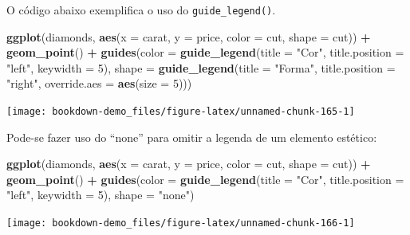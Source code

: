 \documentclass[]{book}
\newenvironment{Shaded}{\begin{snugshade}}{\end{snugshade}}
\newcommand{\KeywordTok}[1]{\textcolor[rgb]{0.13,0.29,0.53}{\textbf{#1}}}
\newcommand{\DataTypeTok}[1]{\textcolor[rgb]{0.13,0.29,0.53}{#1}}
\newcommand{\DecValTok}[1]{\textcolor[rgb]{0.00,0.00,0.81}{#1}}
\newcommand{\StringTok}[1]{\textcolor[rgb]{0.31,0.60,0.02}{#1}}
\newcommand{\OperatorTok}[1]{\textcolor[rgb]{0.81,0.36,0.00}{\textbf{#1}}}
\newcommand{\NormalTok}[1]{#1}
\begin{document}
O código abaixo exemplifica o uso do \texttt{guide\_legend()}.

\begin{Shaded}
\begin{Highlighting}[]
\KeywordTok{ggplot}\NormalTok{(diamonds, }\KeywordTok{aes}\NormalTok{(}\DataTypeTok{x =}\NormalTok{ carat, }\DataTypeTok{y =}\NormalTok{ price, }\DataTypeTok{color =}\NormalTok{ cut, }\DataTypeTok{shape =}\NormalTok{ cut)) }\OperatorTok{+}
\StringTok{  }\KeywordTok{geom_point}\NormalTok{() }\OperatorTok{+}
\StringTok{  }\KeywordTok{guides}\NormalTok{(}\DataTypeTok{color =} \KeywordTok{guide_legend}\NormalTok{(}\DataTypeTok{title =} \StringTok{"Cor"}\NormalTok{, }\DataTypeTok{title.position =} \StringTok{"left"}\NormalTok{, }\DataTypeTok{keywidth =} \DecValTok{5}\NormalTok{),}
         \DataTypeTok{shape =} \KeywordTok{guide_legend}\NormalTok{(}\DataTypeTok{title =} \StringTok{"Forma"}\NormalTok{, }\DataTypeTok{title.position =} \StringTok{"right"}\NormalTok{, }\DataTypeTok{override.aes =} \KeywordTok{aes}\NormalTok{(}\DataTypeTok{size =} \DecValTok{5}\NormalTok{)))}
\end{Highlighting}
\end{Shaded}

\begin{center}\texttt{[image: bookdown-demo\_files/figure-latex/unnamed-chunk-165-1]} \end{center}

Pode-se fazer uso do ``none'' para omitir a legenda de um elemento
estético:

\begin{Shaded}
\begin{Highlighting}[]
\KeywordTok{ggplot}\NormalTok{(diamonds, }\KeywordTok{aes}\NormalTok{(}\DataTypeTok{x =}\NormalTok{ carat, }\DataTypeTok{y =}\NormalTok{ price, }\DataTypeTok{color =}\NormalTok{ cut, }\DataTypeTok{shape =}\NormalTok{ cut)) }\OperatorTok{+}
\StringTok{  }\KeywordTok{geom_point}\NormalTok{() }\OperatorTok{+}
\StringTok{  }\KeywordTok{guides}\NormalTok{(}\DataTypeTok{color =} \KeywordTok{guide_legend}\NormalTok{(}\DataTypeTok{title =} \StringTok{"Cor"}\NormalTok{, }\DataTypeTok{title.position =} \StringTok{"left"}\NormalTok{, }\DataTypeTok{keywidth =} \DecValTok{5}\NormalTok{),}
         \DataTypeTok{shape =} \StringTok{"none"}\NormalTok{)}
\end{Highlighting}
\end{Shaded}

\begin{center}\texttt{[image: bookdown-demo\_files/figure-latex/unnamed-chunk-166-1]} \end{center}
\end{document}
